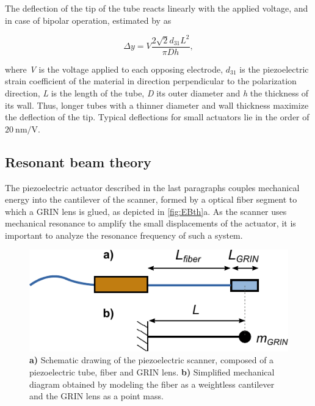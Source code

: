 The deflection of the tip of the tube reacts linearly with the applied voltage, and in case of bipolar operation, estimated by \cite{Chen} as

\begin{equation}
\Delta y = V  \frac{2 \sqrt{2} d_{31} L^2}{\pi D h},
\end{equation}

where \textit{V} is the voltage applied to each opposing electrode, $d_{31}$ is the piezoelectric strain coefficient of the material in direction perpendicular to the polarization direction, \textit{L} is the length of the tube, \textit{D} its outer diameter and \textit{h} the thickness of its wall. Thus, longer tubes with a thinner diameter and wall thickness maximize the deflection of the tip. Typical deflections for small actuators lie in the order of $\SI{20}{\nano\meter / \volt}$.


\subsection{Resonant beam theory}
\label{sec:EB}
The piezoelectric actuator described in the last paragraphs couples mechanical energy into the cantilever of the scanner, formed by a optical fiber segment to which a GRIN lens is glued, as depicted in \autoref{fig:EBth}a. As the scanner uses mechanical resonance to amplify the small displacements of the actuator, it is important to analyze the resonance frequency of such a system. 

\begin{figure}[h!]\centering
      \includegraphics{figures/20_Theory/Mechanical/EB.pdf}
      \caption{\textbf{a)} Schematic drawing of the piezoelectric scanner, composed of a piezoelectric tube, fiber and GRIN lens. 
      \textbf{b)} Simplified mechanical diagram obtained by modeling the fiber as a weightless cantilever and the GRIN lens as a point mass.}
      \label{fig:EBth}
\end{figure}

